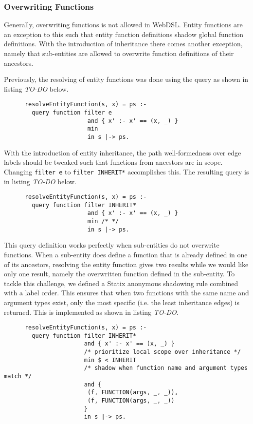     \subsubsection{Overwriting Functions}
      Generally, overwriting functions is not allowed in WebDSL. Entity functions are an exception to this such that entity function definitions shadow global function definitions. With the introduction of inheritance there comes another exception, namely that sub-entities are allowed to overwrite function definitions of their ancestors.

      Previously, the resolving of entity functions was done using the query as shown in listing \emph{TO-DO} below.

      \begin{lstlisting}
      resolveEntityFunction(s, x) = ps :-
        query function filter e
                        and { x' :- x' == (x, _) }
                        min
                        in s |-> ps.
      \end{lstlisting}

      With the introduction of entity inheritance, the path well-formedness over edge labels should be tweaked such that functions from ancestors are in scope. Changing \texttt{filter e} to \texttt{filter INHERIT*} accomplishes this. The resulting query is in listing \emph{TO-DO} below.

      \begin{lstlisting}
      resolveEntityFunction(s, x) = ps :-
        query function filter INHERIT*
                        and { x' :- x' == (x, _) }
                        min /* */
                        in s |-> ps.
      \end{lstlisting}

      This query definition works perfectly when sub-entities do not overwrite functions. When a sub-entity does define a function that is already defined in one of its ancestors, resolving the entity function gives two results while we would like only one result, namely the overwritten function defined in the sub-entity. To tackle this challenge, we defined a Statix anonymous shadowing rule combined with a label order. This ensures that when two functions with the same name and argument types exist, only the most specific (i.e. the least inheritance edges) is returned. This is implemented as shown in listing \emph{TO-DO}.

      \begin{lstlisting}
      resolveEntityFunction(s, x) = ps :-
        query function filter INHERIT*
                       and { x' :- x' == (x, _) }
                       /* prioritize local scope over inheritance */
                       min $ < INHERIT
                       /* shadow when function name and argument types match */
                       and {
                        (f, FUNCTION(args, _, _)),
                        (f, FUNCTION(args, _, _))
                       }
                       in s |-> ps.
      \end{lstlisting}


